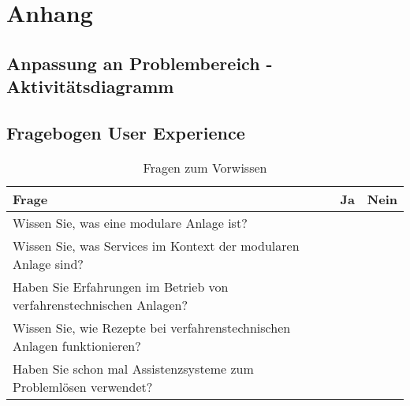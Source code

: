 \chapter{Anhang}

\section{Anpassung an Problembereich - Aktivitätsdiagramm}

\section{Fragebogen User Experience}

\begin{table}[htbp]
\caption{Fragen zum Vorwissen}
\centering
\begin{tabular}{|p{}|l|l|}
\hline
Frage & Ja & Nein \\
\hline
Wissen Sie, was eine modulare Anlage ist? & & \\
\hline
Wissen Sie, was Services im Kontext der modularen Anlage sind? & & \\
\hline
Haben Sie Erfahrungen im Betrieb von verfahrenstechnischen Anlagen? & & \\
\hline
Wissen Sie, wie Rezepte bei verfahrenstechnischen Anlagen funktionieren? & & \\
\hline
Haben Sie schon mal Assistenzsysteme zum Problemlösen verwendet? & & \\
\hline 
\end{tabular}
\end{table}

